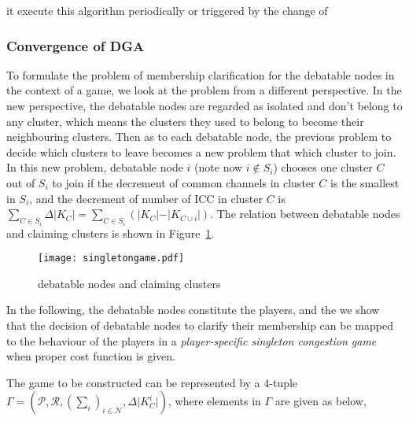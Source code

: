 it  execute this algorithm periodically or triggered by the change of 

\subsubsection*{Convergence of DGA}
To formulate the problem of membership clarification for the debatable nodes in the context of a game, we look at the problem from a different perspective. 
In the new perspective, the debatable nodes are regarded as isolated and don't belong to any cluster, which means the clusters they used to belong to become their neighbouring clusters. 
Then as to each debatable node, the previous problem to decide which clusters to leave becomes a new problem that which cluster to join.
In this new problem, debatable node $i$ (note now $i\notin S_i$) chooses one cluster $C$ out of $S_i$ to join if the decrement of common channels in cluster $C$ is the  %
smallest in $S_i$, and the decrement of number of ICC in cluster $C$ is $\sum_{C\in S_i}\Delta\vert K_C \vert=\sum_{C\in S_i}({\vert K_{C} \vert-\vert K_{C\cup i} \vert})$. %
The relation between debatable nodes and claiming clusters is shown in Figure~\ref{debatable_nodes_claiming_cluster}.
\begin{figure}[ht!]
  \centering
  \texttt{[image: singletongame.pdf]}
  \caption{debatable nodes and claiming clusters}
  \label{debatable_nodes_claiming_cluster}
\end{figure}

In the following, the debatable nodes constitute the players, and the 
we show that the decision of debatable nodes to clarify their membership can be mapped to the behaviour of the players in a \textit{player-specific singleton congestion game} when proper cost function is given.

The game to be constructed can be represented by a 4-tuple $\Gamma=(\mathcal{P},\mathcal{R},(\sum_i)_{i \in \mathcal{N}},\Delta\vert K^i_C \vert)$, where elements in $\Gamma$ are given as below,

